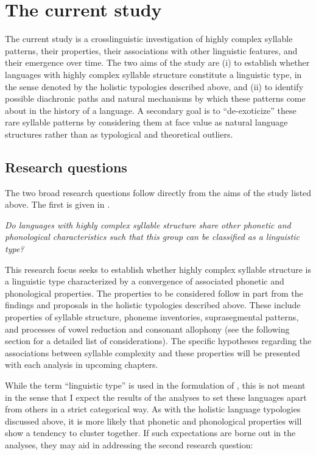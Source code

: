 \section{The current study}\label{sec:1.4}

  The current study is a crosslinguistic investigation of highly complex syllable patterns, their properties, their associations with other linguistic features, and their emergence over time. The two aims of the study are (i) to establish whether languages with highly complex syllable structure constitute a linguistic type, in the sense denoted by the holistic typologies described above, and (ii) to identify possible diachronic paths and natural mechanisms by which these patterns come about in the history of a language. A secondary goal is to ``de-exoticize'' these rare syllable patterns by considering them at face value as natural language structures rather than as typological and theoretical outliers.

\subsection{Research questions}\label{sec:1.4.1}

  The two broad research questions follow directly from the aims of the study listed above. The first is given in .

\ea\label{ex:1.23}
   \textit{Do languages with highly complex syllable structure share other phonetic and phonological characteristics such that this group can be classified as a linguistic type?}
\z

  This research focus seeks to establish whether highly complex syllable structure is a linguistic type characterized by a convergence of associated phonetic and phonological properties. The properties to be considered follow in part from the findings and proposals in the holistic typologies described above. These include properties of syllable structure, phoneme inventories, suprasegmental patterns, and processes of vowel reduction and consonant allophony (see the following section for a detailed list of considerations). The specific hypotheses regarding the associations between syllable complexity and these properties will be presented with each analysis in upcoming chapters.

  While the term ``linguistic type'' is used in the formulation of , this is not meant in the sense that I expect the results of the analyses to set these languages apart from others in a strict categorical way. As with the holistic language typologies discussed above, it is more likely that phonetic and phonological properties will show a tendency to cluster together. If such expectations are borne out in the analyses, they may aid in addressing the second research question:


